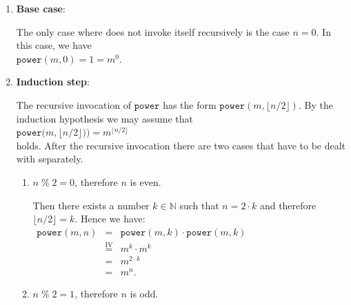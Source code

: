 \begin{enumerate}
\item \textbf{Base case}:

      The only case where  does not invoke itself recursively is the case $n = 0$.  
      In this case, we have
      \\[0.2cm]
      \hspace*{1.3cm} 
      $\mathtt{power}(m,0) = 1 =  m^0$. \mycheck
\item \textbf{Induction step}:

      The recursive invocation of $\mathtt{power}$ has the form
      $\mathtt{power}(m, \lfloor n / 2 \rfloor)$.  By the induction hypothesis we may assume that
      \\[0.2cm]
      \hspace*{1.3cm}
      $\displaystyle \mathtt{power}\bigr(m, \lfloor n / 2 \rfloor)\bigr) = m^{\lfloor n/2 \rfloor}$ 
      \\[0.2cm]
      holds.  After the recursive invocation there are two cases that have to be dealt with separately.
      \begin{enumerate}
      \item $n \;\mathtt{\%}\; 2 = 0$, therefore $n$ is even.

            Then there exists a number $k \in \mathbb{N}$ such that $n = 2 \cdot k$ and therefore
            $\lfloor n / 2 \rfloor = k$.
            Hence we have:
            \\[0.2cm]
            \hspace*{1.3cm}
           $ 
            \begin{array}{lcl}
            \mathtt{power}(m,n) & = & \mathtt{power}(m,k) \cdot \mathtt{power}(m,k) \\[0.2cm]
                                & \stackrel{\mathrm{IV}}{=} & m^k \cdot m^k  \\[0.2cm]
                                & = & m^{2\cdot k} \\[0.2cm]
                                & = & m^{n}.
            \end{array}
            $            
      \item $n \;\mathtt{\%}\; 2 = 1$, therefore $n$ is odd.


\end{enumerate}
\end{enumerate}
